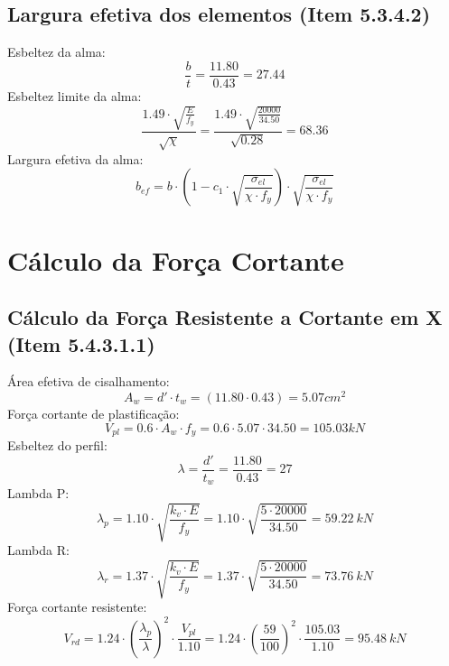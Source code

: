 \documentclass{article}%
\begin{document}
%
\subsection{Largura efetiva dos elementos (Item 5.3.4.2)}%
\label{subsec:Larguraefetivadoselementos(Item5.3.4.2)}%
Esbeltez da alma:%
\[%
\frac{b}{t} = \frac{11.80}{0.43} = 27.44 
%
\]%
Esbeltez limite da alma:%
\[%
\frac{1.49 \cdot \sqrt{\frac{E}{f_y}}}{\sqrt{\chi}}  = \frac{1.49 \cdot \sqrt{\frac{20000}{34.50}}}{\sqrt{0.28}}  = 68.36 
%
\]%
Largura efetiva da alma:%
\[%
 b_{ef} = b \cdot \left( 1 - c_1 \cdot \sqrt{\frac{\sigma_{el}}{\chi \cdot f_y}} \right) \cdot \sqrt{\frac{\sigma_{el}}{\chi \cdot f_y}} %
\]

%
\section{Cálculo da Força Cortante}%
\label{sec:ClculodaForaCortante}%

%
\subsection{Cálculo da Força Resistente a Cortante em X (Item 5.4.3.1.1)}%
\label{subsec:ClculodaForaResistenteaCortanteemX(Item5.4.3.1.1)}%
Área efetiva de cisalhamento:%
\[%
A_w = d' \cdot t_w = (11.80 \cdot 0.43) = 5.07    {cm}^2%
\]%
Força cortante de plastificação:%
\[%
V_{pl} = 0.6 \cdot A_w \cdot f_y = 0.6 \cdot 5.07 \cdot 34.50 = 105.03    kN%
\]%
Esbeltez do perfil:%
\[%
\lambda = \frac{d'}{t_w} = \frac{11.80}{0.43} = 27%
\]%
Lambda P:%
\[%
\lambda_p = 1.10 \cdot \sqrt{\frac{{k_v \cdot E}}{{f_y}}} = 1.10 \cdot \sqrt{\frac{{5 \cdot 20000}}{{34.50}}} = 59.22   ~   kN%
\]%
Lambda R:%
\[%
\lambda_r = 1.37 \cdot \sqrt{\frac{{k_v \cdot E}}{{f_y}}} = 1.37 \cdot \sqrt{\frac{{5 \cdot 20000}}{{34.50}}} = 73.76   ~   kN%
\]%
Força cortante resistente:%
\[%
V_{rd} = 1.24 \cdot \left(\frac{\lambda_p}{\lambda}\right)^2 \cdot \frac{V_{pl}}{1.10}  = 1.24 \cdot \left(\frac{59}{100}\right)^2 \cdot \frac{105.03}{1.10} = 95.48   ~   kN%
\]

%
\end{document}
